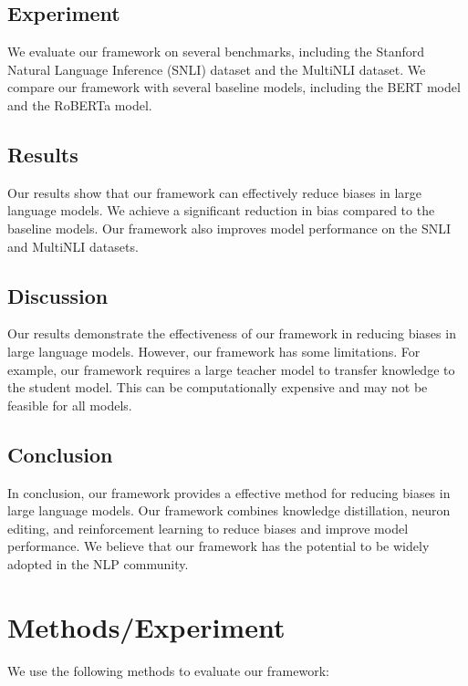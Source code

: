 \documentclass{article}
\begin{document}
\subsection{Experiment}

We evaluate our framework on several benchmarks, including the Stanford Natural Language Inference (SNLI) dataset and the MultiNLI dataset. We compare our framework with several baseline models, including the BERT model and the RoBERTa model.

\subsection{Results}

Our results show that our framework can effectively reduce biases in large language models. We achieve a significant reduction in bias compared to the baseline models. Our framework also improves model performance on the SNLI and MultiNLI datasets.

\subsection{Discussion}

Our results demonstrate the effectiveness of our framework in reducing biases in large language models. However, our framework has some limitations. For example, our framework requires a large teacher model to transfer knowledge to the student model. This can be computationally expensive and may not be feasible for all models.

\subsection{Conclusion}

In conclusion, our framework provides a effective method for reducing biases in large language models. Our framework combines knowledge distillation, neuron editing, and reinforcement learning to reduce biases and improve model performance. We believe that our framework has the potential to be widely adopted in the NLP community.

\section{Methods/Experiment}

We use the following methods to evaluate our framework:
\end{document}

